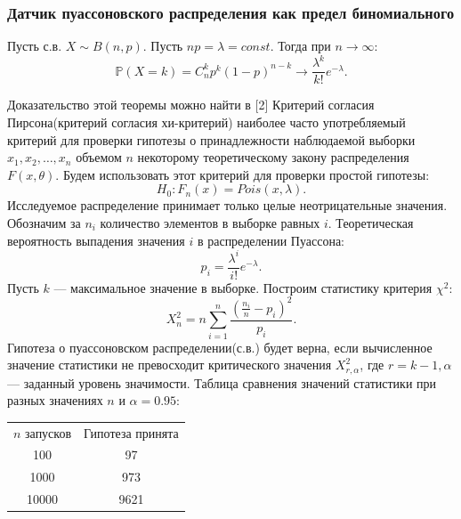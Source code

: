 \documentclass[11pt]{article}
\begin{document}
    \subsubsection{Датчик пуассоновского распределения как предел биномиального}
    \begin{theorem}
    	Пусть с.в. $X \sim B(n,p).$ Пусть $np = \lambda = const.$ Тогда при $n \rightarrow \infty:$
    	\[ \mathbb{P}(X = k) = C^k_np^k(1 - p)^{n - k} \rightarrow \frac{\lambda^k}{k!}e^{-\lambda}. \]
    \end{theorem}
	Доказательство этой теоремы можно найти в [2]
	\newline
	Критерий согласия Пирсона(критерий согласия хи-критерий) наиболее часто употребляемый критерий для проверки гипотезы о принадлежности наблюдаемой выборки $x_1,x_2,\dots,x_n$ объемом $n$ некоторому теоретическому закону распределения $F(x,\theta).$
	\newline 
	Будем использовать этот критерий для проверки простой гипотезы:
	\[H_0 : F_n(x) = Pois(x,\lambda). \]
	Исследуемое распределение принимает только целые неотрицательные значения. Обозначим за $n_i$ количество элементов в выборке равных $i$. Теоретическая вероятность выпадения значения $i$ в распределении Пуассона:
	\[ p_i = \frac{\lambda^i}{i!}e^{-\lambda}. \]
	Пусть $k$ --- максимальное значение в выборке. Построим статистику критерия $\chi^2$:
	\[ X_n^2 = n\sum_{i = 1}^{n}\frac{(\frac{n_i}{n} - p_i)^2}{p_i} .\]
	Гипотеза о пуассоновском распределении(с.в.) будет верна, если вычисленное значение статистики не превосходит критического значения $X_{r,\alpha}^2$, где $r = k - 1,\alpha$--- заданный уровень значимости.
	\newline
	Таблица сравнения значений статистики при разных значениях $n$ и $\alpha = 0.95$:
	\newline
	\begin{center}
	\begin{tabular}{|c|c|}
		\hline
		$n$ запусков & Гипотеза принята  \\
		100 & 97  \\
		1000 & 973  \\
		10000 & 9621 \\
		\hline
	\end{tabular}
	\end{center}
	
\end{document}
